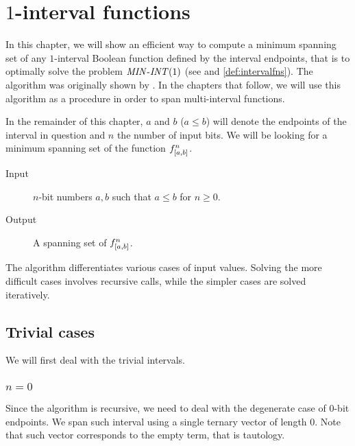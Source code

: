\chapter{\texorpdfstring{$1$}{1}-interval functions}
\label{chap:1interval}

In this chapter,
we will show an efficient way to compute
a minimum spanning set of any $1$-interval Boolean function
defined by the interval endpoints,
that is to optimally solve the problem
$\mathit{MIN\text{-}INT} (1)$
(see 
and \cref{def:intervalfns}).
The algorithm was originally shown by
\citet{Schieber2005154}.
In the chapters that follow,
we will use this algorithm as a procedure
in order to span multi-interval functions.

In the remainder of this chapter,
$a$ and $b$ ($a \leq b$) will denote the endpoints
of the interval in question
and $n$ the number of input bits.
We will be looking for a minimum spanning set
of the function $f^{n}_{[a, b]}$.


\begin{description}
\item[Input] $n$-bit numbers $a, b$ such that $a \leq b$ for $n \geq 0$.
\item[Output] A spanning set of $f^{n}_{[a, b]}$.
\end{description}

The algorithm differentiates various cases
of input values.
Solving the more difficult cases involves recursive calls,
while the simpler cases are solved iteratively.

\section{Trivial cases}

We will first deal with the trivial intervals.

\subsection{\texorpdfstring{$n=0$}{n=0}}

Since the algorithm is recursive,
we need to deal with the degenerate case
of $0$-bit endpoints.
We span such interval using a single ternary vector
of length $0$.
Note that such vector corresponds to the empty term,
that is tautology.

